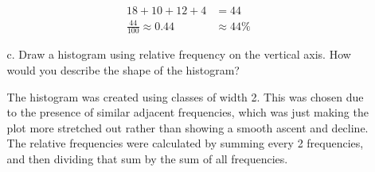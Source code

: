 \documentclass[letterpaper,12pt]{article}
\begin{document}
\begin{enumerate}
\begin{enumerate}
        \begin{align*}
          18 + 10 + 12 + 4 &= 44 \\
          \frac{44}{100} \approx 0.44 &\approx 44\%
        \end{align*}
      \item[c.]
        Draw a histogram using relative frequency on the vertical axis. How would you describe the shape of the histogram?
        \begin{center}
        \end{center}
        The histogram was created using classes of width 2. This was chosen due to the presence of similar adjacent frequencies, which was just making the plot more stretched out rather than showing a smooth ascent and decline. The relative frequencies were calculated by summing every 2 frequencies, and then dividing that sum by the sum of all frequencies.


\end{enumerate}
\end{enumerate}
\end{document}
